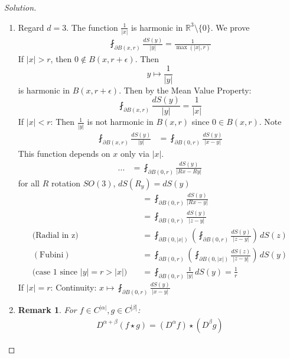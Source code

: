 \documentclass{report}
\theoremstyle{tommy}
\newtheorem{rem}[defn]{Remark}
\begin{document}
  \begin{proof}[Solution]
    \begin{enumerate}[label=\alph*)]
      \item Regard \(d = 3\). The function \(\frac{1}{|x|}\) is harmonic in \(\mathbb{R}^3 \setminus \{0\}\). We prove 
      \begin{align*}
        \fint_{\partial B(x, r)} \frac{dS(y)}{|y|} = \frac{1}{\max(|x|, r)}
      \end{align*}
      If \(|x| > r\), then \(0 \notin B(x,r + \epsilon)\). Then
      \[y \mapsto \frac{1}{|y|}\] is harmonic in \(B(x, r  + \epsilon)\). Then by the Mean Value Property:
      \[\fint_{\partial B(x,r)} \frac{dS(y)}{|y|} = \frac{1}{|x|}\]
      If \(|x| < r\): Then \(\frac{1}{|y|}\) is not harmonic in \(B(x,r)\) since \(0 \in B(x,r)\). Note
      \begin{align*}
        \fint_{\partial B(x,r)} \frac{d S(y)}{|y|} 
        &= \fint_{\partial B(0, r)} \frac{dS(y)}{|x-y|}
      \end{align*}
      This function depends on \(x\) only via \(|x|\). 
      \begin{align*}
        ... &= \fint_{\partial B(0,r)} \frac{dS(y)}{|Rx-Ry|}
      \end{align*}
      for all \(R\) rotation \(SO(3)\), \(dS(R_y) = dS(y)\)
      \begin{align*}
        &= \fint_{\partial B(0, r)} \frac{dS(y)}{|Rx - y|} \\
        &= \fint_{\partial B(0, r)} \frac{dS(y)}{|z - y|} \\
        \text{(Radial in z)} \quad &= \fint_{\partial B(0, |x|)} \left(\fint_{\partial B(0, r)} \frac{dS(y)}{|z-y|}\right) \, dS(z) \\
        (\text{Fubini}) \quad &= \fint_{\partial B(0,r)} \left(\fint_{\partial B(0, |x|)} \frac{dS(z)}{|z-y|}\right) \, dS(y) \\
        (\text{case 1 since \(|y| = r > |x|\))} \quad &= \fint_{\partial B(0,r)} \frac{1}{|y|} \, dS(y)
        = \frac{1}{r}
      \end{align*}
      If \(|x| = r\): Continuity: \(x \mapsto \fint_{\partial B(0, r)} \frac{dS(y)}{|x-y|}\)
    \item \begin{rem}
      For \(f \in C^{|\alpha|}, g \in C^{|\beta|}\):
      \begin{align*}
        D^{\alpha + \beta}(f \star g) = (D^\alpha f)\star(D^\beta g)
      \end{align*}
    \end{rem}
    

\end{enumerate}
\end{proof}
\end{document}
